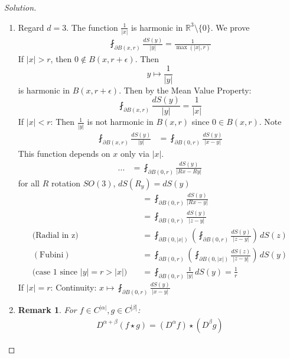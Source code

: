 \documentclass{report}
\theoremstyle{tommy}
\newtheorem{rem}[defn]{Remark}
\begin{document}
  \begin{proof}[Solution]
    \begin{enumerate}[label=\alph*)]
      \item Regard \(d = 3\). The function \(\frac{1}{|x|}\) is harmonic in \(\mathbb{R}^3 \setminus \{0\}\). We prove 
      \begin{align*}
        \fint_{\partial B(x, r)} \frac{dS(y)}{|y|} = \frac{1}{\max(|x|, r)}
      \end{align*}
      If \(|x| > r\), then \(0 \notin B(x,r + \epsilon)\). Then
      \[y \mapsto \frac{1}{|y|}\] is harmonic in \(B(x, r  + \epsilon)\). Then by the Mean Value Property:
      \[\fint_{\partial B(x,r)} \frac{dS(y)}{|y|} = \frac{1}{|x|}\]
      If \(|x| < r\): Then \(\frac{1}{|y|}\) is not harmonic in \(B(x,r)\) since \(0 \in B(x,r)\). Note
      \begin{align*}
        \fint_{\partial B(x,r)} \frac{d S(y)}{|y|} 
        &= \fint_{\partial B(0, r)} \frac{dS(y)}{|x-y|}
      \end{align*}
      This function depends on \(x\) only via \(|x|\). 
      \begin{align*}
        ... &= \fint_{\partial B(0,r)} \frac{dS(y)}{|Rx-Ry|}
      \end{align*}
      for all \(R\) rotation \(SO(3)\), \(dS(R_y) = dS(y)\)
      \begin{align*}
        &= \fint_{\partial B(0, r)} \frac{dS(y)}{|Rx - y|} \\
        &= \fint_{\partial B(0, r)} \frac{dS(y)}{|z - y|} \\
        \text{(Radial in z)} \quad &= \fint_{\partial B(0, |x|)} \left(\fint_{\partial B(0, r)} \frac{dS(y)}{|z-y|}\right) \, dS(z) \\
        (\text{Fubini}) \quad &= \fint_{\partial B(0,r)} \left(\fint_{\partial B(0, |x|)} \frac{dS(z)}{|z-y|}\right) \, dS(y) \\
        (\text{case 1 since \(|y| = r > |x|\))} \quad &= \fint_{\partial B(0,r)} \frac{1}{|y|} \, dS(y)
        = \frac{1}{r}
      \end{align*}
      If \(|x| = r\): Continuity: \(x \mapsto \fint_{\partial B(0, r)} \frac{dS(y)}{|x-y|}\)
    \item \begin{rem}
      For \(f \in C^{|\alpha|}, g \in C^{|\beta|}\):
      \begin{align*}
        D^{\alpha + \beta}(f \star g) = (D^\alpha f)\star(D^\beta g)
      \end{align*}
    \end{rem}
    

\end{enumerate}
\end{proof}
\end{document}
